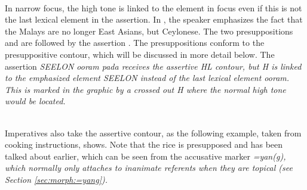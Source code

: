  \\



In narrow focus, the high tone is linked to the element in focus even if this is not the last lexical element in the assertion. In , the speaker emphasizes the fact that the Malays are no longer East Asians, but Ceylonese. The two presuppositions  and  are followed by the assertion . The presuppositions conform to the presuppositive contour, which will be discussed in more detail below. The assertion \em SEELON ooram pada \em receives the assertive HL contour, but H is linked to the emphasized element \em SEELON \em instead of the last lexical element \em ooram\em. This is marked in the graphic by a crossed out H where the normal high tone would be located.


 \\
Imperatives also take the assertive contour, as the following example, taken from cooking instructions, shows. Note that the rice is presupposed and has been talked about earlier, which can be seen from the accusative marker \em =yan(g)\em, which normally only attaches to inanimate referents when they are topical (see Section \ref{sec:morph:=yang}).


